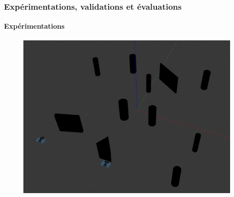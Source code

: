 \documentclass{beamer}
\begin{document}
				\begin{frame}
					\frametitle{Expérimentations, validations et évaluations}
					\framesubtitle{Expérimentations}
					\begin{figure}[H]
						\centering
						\includegraphics[width=0.8\linewidth]{graphics/exemple_model.png}
					\end{figure}
				\end{frame}
\end{document}
